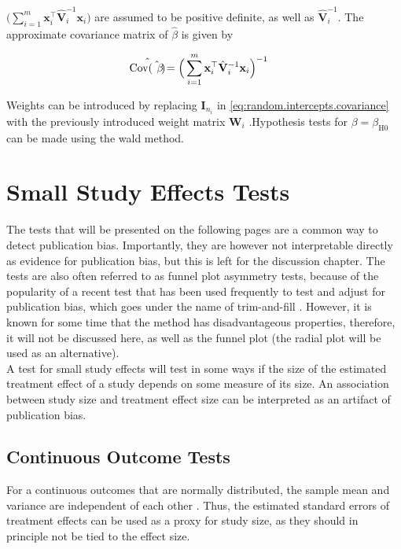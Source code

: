 \documentclass[11pt,a4paper,twoside]{book}\usepackage[]{graphicx}\usepackage[]{color}
\begin{document}
$\Big( \sum_{i = 1}^m \mathbf{x}_i^\top \hat{\mathbf{V}}_i^{-1} \mathbf{x}_i \Big)$ are assumed to be positive definite, as well as  $\hat{\mathbf{V}}_i^{-1}$. The approximate covariance matrix of $\hat{\beta}$ is given by

\begin{align}
\hat{\operatorname{Cov}(\hat{\beta})} &= \Big( \sum_{i = 1}^m \mathbf{x}_i^\top \hat{\mathbf{V}}_i^{-1} \mathbf{x}_i \Big)^{-1}
\end{align}

Weights can be introduced by replacing $\mathbf{I}_{n_i}$ in \eqref{eq:random.intercepts.covariance} with the previously introduced weight matrix $\mathbf{W}_i$ .Hypothesis tests for $\beta = \beta_\textrm{H0}$ can be made using the wald method. 










\section{Small Study Effects Tests}
The tests that will be presented on the following pages are a common way to detect publication bias. Importantly, they are however not interpretable directly as evidence for publication bias, but this is left for the discussion chapter. The tests are also often referred to as funnel plot asymmetry tests, because of the popularity of a recent test that has been used frequently to test and adjust for publication bias, which goes under the name of trim-and-fill \citep{trimfill}. However, it is known for some time that the method has disadvantageous properties, therefore, it will not be discussed here, as well as the funnel plot (the radial plot will be used as an alternative).\\
A test for small study effects will test in some ways if the size of the estimated treatment effect of a study depends on some measure of its size. An association between study size and treatment effect size can be interpreted as an artifact of publication bias.

\subsection{Continuous Outcome Tests}
For a continuous outcomes that are normally distributed, the sample mean and variance are independent of each other \cite[120]{meta.w.R}. Thus, the estimated standard errors of treatment effects can be used as a proxy for study size, as they should in principle not be tied to the effect size.
\end{document}
